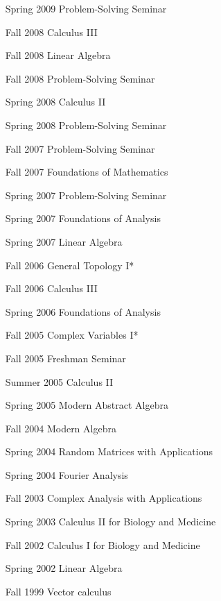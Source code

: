 \documentclass[11pt,a4paper,ragged2e,withhyper]{altacv}
\begin{document}
\begin{multicols}{2}
\begin{enumerate}[labelindent=0pt,labelwidth=2cm,leftmargin=!]
\item[Spring 2009] Problem-Solving Seminar
\item[Fall 2008] Calculus III
\item[Fall 2008] Linear Algebra
\item[Fall 2008] Problem-Solving Seminar
\item[Spring 2008] Calculus II
\item[Spring 2008] Problem-Solving Seminar
\item[Fall 2007] Problem-Solving Seminar
\item[Fall 2007] Foundations of Mathematics
\item[Spring 2007] Problem-Solving Seminar
\item[Spring 2007] Foundations of Analysis
\item[Spring 2007] Linear Algebra
\item[Fall 2006] General Topology I*
\item[Fall 2006] Calculus III
\item[Spring 2006] Foundations of Analysis
\item[Fall 2005] Complex Variables I*
\item[Fall 2005] Freshman Seminar
\item[Summer 2005] Calculus II
\item[Spring 2005] Modern Abstract Algebra
\item[Fall 2004] Modern Algebra
\item[Spring 2004] Random Matrices with Applications
\item[Spring 2004] Fourier Analysis
\item[Fall 2003] Complex Analysis with Applications
\item[Spring 2003] Calculus II for Biology and Medicine
\item[Fall 2002] Calculus I for Biology and Medicine
\item[Spring 2002] Linear Algebra
\item[Fall 1999] Vector calculus
\end{enumerate}
\end{multicols}
\end{document}

